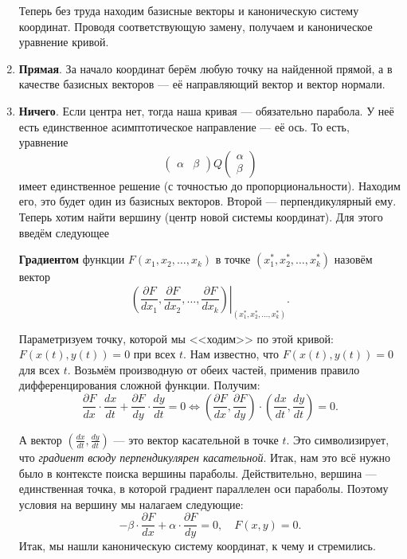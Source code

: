 \begin{enumerate}
        Теперь без труда находим базисные векторы и каноническую систему координат. Проводя соответствующую замену, получаем и каноническое уравнение кривой.
    \item \textbf{Прямая}. За начало координат берём любую точку на найденной прямой, а в качестве базисных векторов --- её направляющий вектор и вектор нормали.
    \item \textbf{Ничего}. Если центра нет, тогда наша кривая --- обязательно парабола. У неё есть единственное асимптотическое направление --- её ось. То есть, уравнение
        $$
        \begin{pmatrix}
            \alpha & \beta
        \end{pmatrix}
        Q
        \begin{pmatrix}
            \alpha\\\beta
        \end{pmatrix}
        $$
        имеет единственное решение (с точностью до пропорциональности). Находим его, это будет один из базисных векторов. Второй --- перпендикулярный ему. Теперь хотим найти вершину (центр новой системы координат). Для этого введём следующее
        \begin{definition}
            \textbf{Градиентом} функции $F(x_1, x_2, \ldots, x_k)$ в точке $(x_1^\ast, x_2^\ast, \ldots, x_k^\ast)$ назовём вектор
            $$
            \left.\left(\frac{\partial F}{dx_1}, \frac{\partial F}{dx_2}, \ldots, \frac{\partial F}{dx_k}\right)\right|_{(x_1^\ast, x_2^\ast, \ldots, x_k^\ast)}.
            $$
        \end{definition}

        Параметризуем точку, которой мы <<ходим>> по этой кривой: $F(x(t), y(t)) = 0$ при всех $t$. Нам известно, что $F(x(t), y(t)) = 0$ для всех $t$. Возьмём производную от обеих частей, применив правило дифференцирования сложной функции. Получим:
        $$
        \frac{\partial F}{dx}\cdot\frac{dx}{dt} + \frac{\partial F}{dy}\cdot\frac{dy}{dt} = 0 \Leftrightarrow \left(\frac{\partial F}{dx}, \frac{\partial F}{dy}\right) \cdot \left(\frac{dx}{dt}, \frac{dy}{dt}\right) = 0.
        $$

        А вектор $\displaystyle\left(\frac{dx}{dt}, \frac{dy}{dt}\right)$ --- это вектор касательной в точке $t$. Это символизирует, что \textit{градиент всюду перпендикулярен касательной}. Итак, нам это всё нужно было в контексте поиска вершины параболы. Действительно, вершина --- единственная точка, в которой градиент параллелен оси параболы. Поэтому условия на вершину мы налагаем следующие:
        $$
        -\beta \cdot \frac{\partial F}{dx} + \alpha \cdot \frac{\partial F}{dy} = 0,\quad F(x, y) = 0.
        $$
        Итак, мы нашли каноническую систему координат, к чему и стремились.
\end{enumerate}



